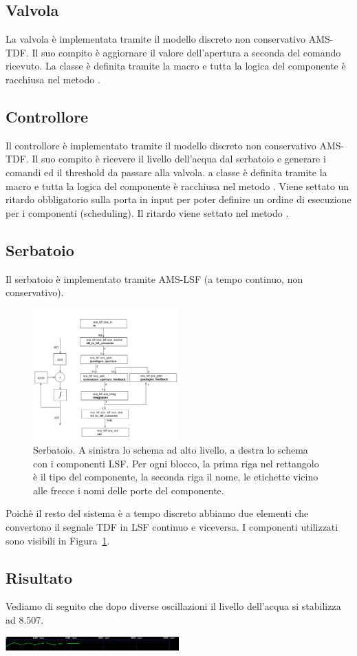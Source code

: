 \subsection{Valvola}

La valvola è implementata tramite il modello discreto non conservativo AMS-TDF. Il suo compito è aggiornare il valore dell'apertura a seconda del comando ricevuto. La classe è definita tramite la macro  e tutta la logica del componente è racchiusa nel metodo .

\subsection{Controllore}

Il controllore è implementato tramite il modello discreto non conservativo AMS-TDF. Il suo compito è ricevere il livello dell'acqua dal serbatoio e generare i comandi ed il threshold da passare alla valvola. a classe è definita tramite la macro  e tutta la logica del componente è racchiusa nel metodo . Viene settato un ritardo obbligatorio sulla porta in input per poter definire un ordine di esecuzione per i componenti (scheduling). Il ritardo viene settato nel metodo . 

\subsection{Serbatoio}

Il serbatoio è implementato tramite AMS-LSF (a tempo continuo, non conservativo). 
\begin{figure}[htbp]
    \centering
    \includegraphics[width=0.5\textwidth]{schemi/ams-water-tank.png}
    \caption{Serbatoio. A sinistra lo schema ad alto livello, a destra lo schema con i componenti LSF. Per ogni blocco, la prima riga nel rettangolo è il tipo del componente, la seconda riga il nome, le etichette vicino alle frecce i nomi delle porte del componente.}
    \label{fig:ams-tank}
\end{figure}
Poichè il resto del sistema è a tempo discreto abbiamo due elementi che convertono il segnale TDF in LSF continuo e viceversa. I componenti utilizzati sono visibili in Figura~\ref{fig:ams-tank}.

\subsection{Risultato}

Vediamo di seguito che dopo diverse oscillazioni il livello dell'acqua si stabilizza ad $8.507$.
\begin{center}
    \includegraphics[width=0.5\textwidth]{schemi/ams-esito.png}
\end{center}